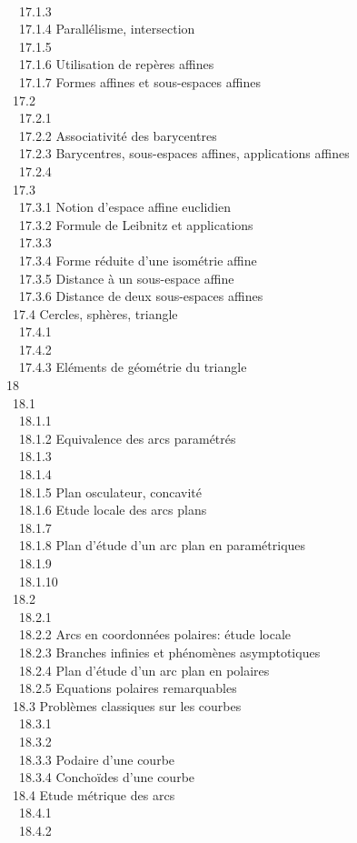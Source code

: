 \documentclass[]{article}
\begin{document}
\\ ~~17.1.3 
\\ ~~17.1.4 {Parallélisme,
intersection} \\ ~~17.1.5
 \\
~~17.1.6 {Utilisation de repères
affines} \\ ~~17.1.7 {Formes
affines et sous-espaces affines} \\ ~17.2
 \\ ~~17.2.1
 \\
~~17.2.2 {Associativité des
barycentres} \\ ~~17.2.3
{Barycentres, sous-espaces
affines, applications affines} \\ ~~17.2.4
 \\
~17.3 
\\ ~~17.3.1 {Notion d'espace
affine euclidien} \\ ~~17.3.2
{Formule de Leibnitz et
applications} \\ ~~17.3.3
 \\ ~~17.3.4
{Forme réduite d'une isométrie
affine} \\ ~~17.3.5 {Distance à
un sous-espace affine} \\ ~~17.3.6
{Distance de deux sous-espaces
affines} \\ ~17.4 {Cercles,
sphères, triangle} \\ ~~17.4.1
 \\
~~17.4.2  \\
~~17.4.3 {Eléments de géométrie
du triangle} \\ 18  \\
~18.1  \\
~~18.1.1  \\
~~18.1.2 {Equivalence des arcs
paramétrés} \\ ~~18.1.3
 \\ ~~18.1.4
 \\
~~18.1.5 {Plan osculateur,
concavité} \\ ~~18.1.6 {Etude
locale des arcs plans} \\ ~~18.1.7
 \\ ~~18.1.8
{Plan d'étude d'un arc plan en
paramétriques} \\ ~~18.1.9
 \\ ~~18.1.10
 \\ ~18.2
 \\ ~~18.2.1
 \\
~~18.2.2 {Arcs en coordonnées
polaires: étude locale} \\ ~~18.2.3
{Branches infinies et phénomènes
asymptotiques} \\ ~~18.2.4 {Plan
d'étude d'un arc plan en polaires} \\ ~~18.2.5
{Equations polaires
remarquables} \\ ~18.3 {Problèmes
classiques sur les courbes} \\ ~~18.3.1
 \\
~~18.3.2 
\\ ~~18.3.3 {Podaire d'une
courbe} \\ ~~18.3.4 {Conchoïdes
d'une courbe} \\ ~18.4 {Etude
métrique des arcs} \\ ~~18.4.1
 \\ ~~18.4.2
\end{document}
